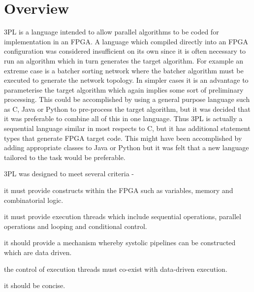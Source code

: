 \pagebreak

\chapter{Overview}

    3PL is a language intended to allow parallel algorithms to be coded for
    implementation in an FPGA. A language which compiled directly into an FPGA
    configuration was considered insufficient on its own since it is often necessary
    to run an algorithm which in turn generates the target algorithm. For example an
    extreme case is a batcher sorting network where the batcher algorithm must be
    executed to generate the network topology. In simpler cases it is an advantage
    to parameterise the target algorithm which again implies some sort of
    preliminary processing. This could be accomplished by using a general purpose
    language such as C, Java or Python to pre-process the target algorithm, but it
    was decided that it was preferable to combine all of this in one language. Thus
    3PL is actually a sequential language similar in most respects to C, but it has
    additional statement types that generate FPGA target code. This might have been
    accomplished by adding appropriate classes to Java or Python but it was felt
    that a new language tailored to the task would be preferable.    
    
    3PL was designed to meet several criteria -
    
    \blist
    \item   it must provide constructs within the FPGA such as variables, memory
    and combinatorial logic.
    \item   it must provide execution threads which include
    sequential operations, parallel operations and looping and conditional control.
    \item   it should provide a mechanism whereby systolic pipelines can be
    constructed which are data driven.
    \item   the control of execution threads must co-exist with data-driven
    execution.
    \item   it should be concise.
    \blend

